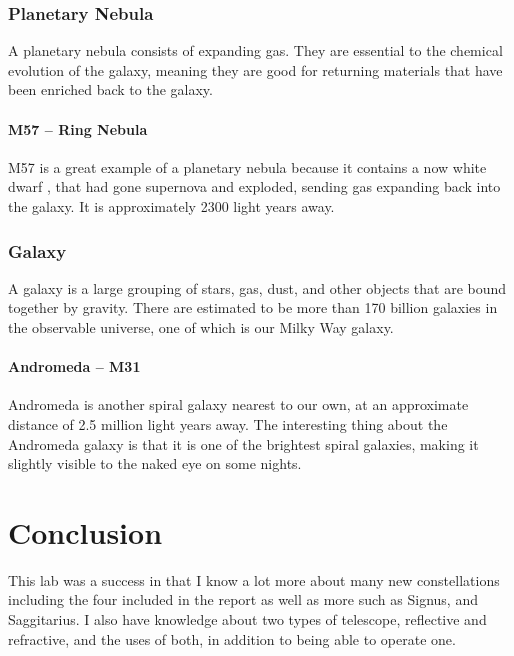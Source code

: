 \documentclass{article}
\begin{document}
\subsubsection{Planetary Nebula}
A planetary nebula consists of expanding gas.  They are essential to the chemical evolution of the galaxy, meaning they are good for returning materials that have been enriched back to the galaxy.
\paragraph{M57 -- Ring Nebula}
M57 is a great example of a planetary nebula because it contains a now white dwarf , that had gone supernova and exploded, sending gas expanding back into the galaxy.  It is approximately 2300 light years away.\cite{ringnebula}    
\subsubsection{Galaxy}
A galaxy is a large grouping of stars, gas, dust, and other objects that are bound together by gravity.  There are estimated to be more than 170 billion galaxies in the observable universe, one of which is our Milky Way galaxy.
\paragraph{Andromeda -- M31}
Andromeda is another spiral galaxy nearest to our own, at an approximate distance of 2.5 million light years away.  The interesting thing about the Andromeda galaxy is that it is one of the brightest spiral galaxies, making it slightly visible to the naked eye on some nights.  
\section{Conclusion}
This lab was a success in that I know a lot more about many new constellations including the four included in the report as well as more such as Signus, and Saggitarius.  I also have knowledge about two types of telescope, reflective and refractive, and the uses of both, in addition to being able to operate one.  


\end{document}

